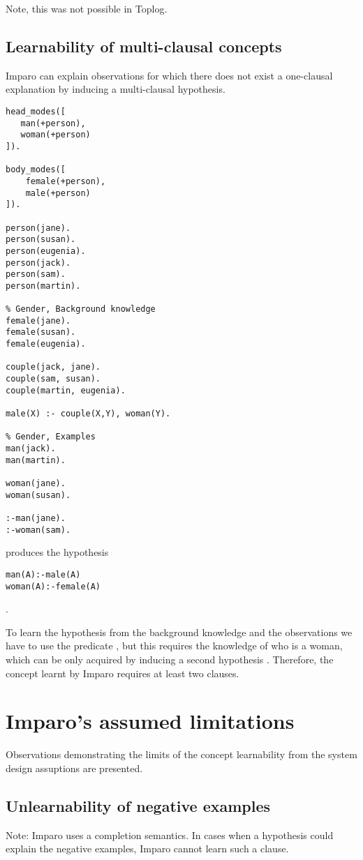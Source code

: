 Note, this was not possible in Toplog.

\subsection{Learnability of multi-clausal concepts}
Imparo can explain observations for which there does not exist a one-clausal explanation by inducing a multi-clausal hypothesis.
\begin{lstlisting}
head_modes([
   man(+person),
   woman(+person)
]).

body_modes([
    female(+person),
    male(+person)
]).

person(jane).
person(susan).
person(eugenia).
person(jack).
person(sam).
person(martin).

% Gender, Background knowledge
female(jane).
female(susan).
female(eugenia).

couple(jack, jane).
couple(sam, susan).
couple(martin, eugenia).

male(X) :- couple(X,Y), woman(Y).

% Gender, Examples
man(jack).
man(martin).

woman(jane).
woman(susan).

:-man(jane).
:-woman(sam).
\end{lstlisting}

produces the hypothesis
\begin{lstlisting}
man(A):-male(A)
woman(A):-female(A)
\end{lstlisting}.

To learn the hypothesis  from the background knowledge and the observations we have to use the predicate , but this requires the knowledge of who is a woman, which can be only acquired by inducing a second hypothesis . Therefore, the concept learnt by Imparo requires at least two clauses.

\section{Imparo's assumed limitations}
Observations demonstrating the limits of the concept learnability from the system design assuptions are presented.

\subsection{Unlearnability of negative examples}
Note: Imparo uses a completion semantics.
In cases when a hypothesis could explain the negative examples, Imparo cannot learn such a clause.

